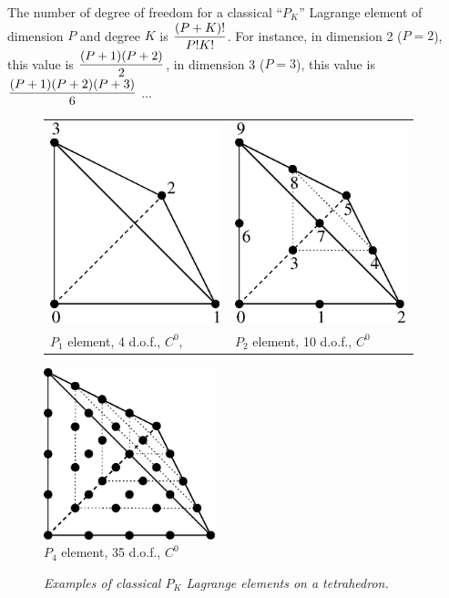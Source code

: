 \documentclass[10pt,a4paper]{article}
\begin{document}
The number of degree of freedom for a classical ``$P_K$'' Lagrange element of dimension $P$ and degree $K$ is ${\displaystyle \frac{\displaystyle (P+K)!}{\displaystyle P!K!}}$. For instance, in dimension 2 ($P = 2$), this value is ${\displaystyle \frac{\displaystyle (P+1) (P+2)}{\displaystyle 2}}$, in dimension 3 ($P = 3$), this value is ${\displaystyle \frac{\displaystyle (P+1) (P+2) (P+3)}{\displaystyle 6}}$ ...

\begin{figure}[H]
  \begin{center}
    \begin{tabular}{m{7cm}m{7cm}}
      \includegraphics[width=5cm,angle=0]{getfemlist_tetrahedron_P1.eps} & \includegraphics[width=5cm,angle=0]{getfemlist_tetrahedron_P2.eps} \\
      $P_1$ element, 4 d.o.f., $C^0$, & $P_2$ element, 10 d.o.f., $C^0$
    \end{tabular}
     \includegraphics[width=5cm,angle=0]{getfemlist_tetrahedron_P4.eps} \\
     $P_4$ element, 35 d.o.f., $C^0$
  \end{center}
  \caption{ \it Examples of classical $P_K$ Lagrange elements on a tetrahedron.} \label{fig:tetrahedronpk}
\end{figure}
\end{document}

